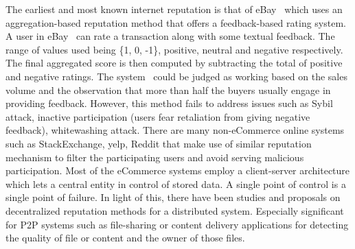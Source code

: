 The earliest and most known internet reputation is that of
eBay~\cite{resnick2002trust} which uses an aggregation-based reputation method
that offers a feedback-based rating system. A user in
eBay~\cite{resnick2006value} can rate a transaction along with some textual
feedback. The range of values used being \{1, 0, -1\}, positive, neutral and
negative respectively. The final aggregated score is then computed by
subtracting the total of positive and negative ratings. The
system~\cite{resnick2006value} could be judged as working based on the sales
volume and the observation that more than half the buyers usually engage in
providing feedback. However, this method fails to address issues such as Sybil
attack, inactive participation (users fear retaliation from giving negative
feedback), whitewashing attack. There are many non-eCommerce online systems
such as StackExchange, yelp, Reddit that make use of similar reputation
mechanism to filter the participating users and avoid serving malicious
participation. Most of the eCommerce systems employ a client-server
architecture which lets a central entity in control of stored data. A single
point of control is a single point of failure. In light of this, there have
been studies and proposals on decentralized reputation methods for a
distributed system. Especially significant for P2P systems such as file-sharing
or content delivery applications for detecting the quality of file or content
and the owner of those files. \par   

